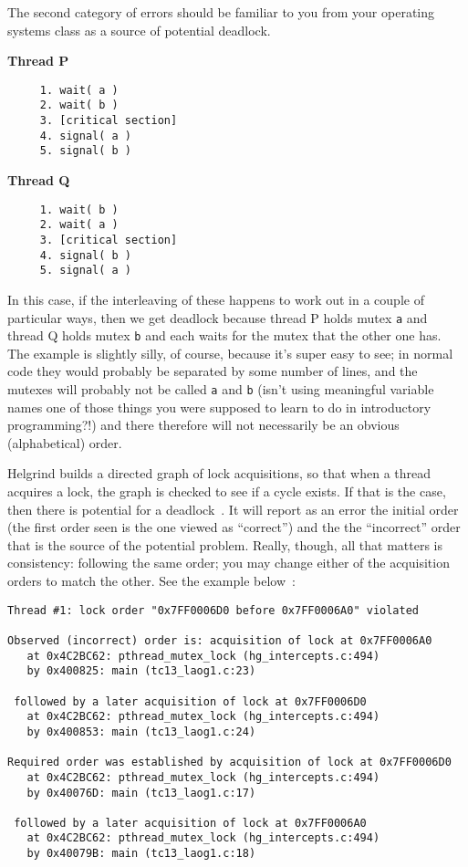 The second category of errors should be familiar to you from your operating systems class as a source of potential deadlock.

\begin{multicols}{2}
\textbf{Thread P}\vspace{-2em}
  \begin{verbatim}
	 1. wait( a ) 
	 2. wait( b )
	 3. [critical section]
	 4. signal( a )
	 5. signal( b )
  \end{verbatim}
\columnbreak
\textbf{Thread Q}\vspace{-2em}
  \begin{verbatim}
	 1. wait( b ) 
	 2. wait( a )
	 3. [critical section]
	 4. signal( b )
	 5. signal( a )
  \end{verbatim}
\end{multicols}
\vspace{-2em}

In this case, if the interleaving of these happens to work out in a couple of particular ways, then we get deadlock because thread P holds mutex \texttt{a} and thread Q holds mutex \texttt{b} and each waits for the mutex that the other one has. The example is slightly silly, of course, because it's super easy to see; in normal code they would probably be separated by some number of lines, and the mutexes will probably not be called \texttt{a} and \texttt{b} (isn't using meaningful variable names one of those things you were supposed to learn to do in introductory programming?!) and there therefore will not necessarily be an obvious (alphabetical) order.

Helgrind builds a directed graph of lock acquisitions, so that when a thread acquires a lock, the graph is checked to see if a cycle exists. If that is the case, then there is potential for a deadlock~\cite{helgrind}. It will report as an error the initial order (the first order seen is the one viewed as ``correct'') and the the ``incorrect'' order that is the source of the potential problem. Really, though, all that matters is consistency: following the same order; you may change either of the acquisition orders to match the other. See the example below~\cite{helgrind}:

\begin{verbatim}
Thread #1: lock order "0x7FF0006D0 before 0x7FF0006A0" violated

Observed (incorrect) order is: acquisition of lock at 0x7FF0006A0
   at 0x4C2BC62: pthread_mutex_lock (hg_intercepts.c:494)
   by 0x400825: main (tc13_laog1.c:23)

 followed by a later acquisition of lock at 0x7FF0006D0
   at 0x4C2BC62: pthread_mutex_lock (hg_intercepts.c:494)
   by 0x400853: main (tc13_laog1.c:24)

Required order was established by acquisition of lock at 0x7FF0006D0
   at 0x4C2BC62: pthread_mutex_lock (hg_intercepts.c:494)
   by 0x40076D: main (tc13_laog1.c:17)

 followed by a later acquisition of lock at 0x7FF0006A0
   at 0x4C2BC62: pthread_mutex_lock (hg_intercepts.c:494)
   by 0x40079B: main (tc13_laog1.c:18)
\end{verbatim}


